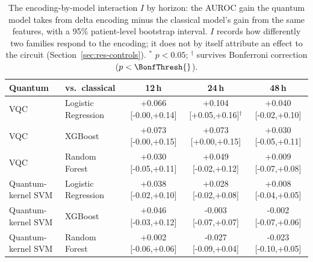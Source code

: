 \begin{table}[!htbp]
\centering
\scriptsize
\renewcommand{\arraystretch}{1.00}
\setlength{\tabcolsep}{3.2pt}
\caption{The encoding-by-model interaction $I$ by horizon: the AUROC gain the quantum model takes from delta encoding minus the classical model's gain from the same features, with a 95\% patient-level bootstrap interval. $I$ records how differently two families respond to the encoding; it does not by itself attribute an effect to the circuit (Section~\ref{sec:res-controls}). $^{*}$ $p<0.05$; $^{\dagger}$ survives Bonferroni correction ($p<\BonfThresh{}$).}
\label{tab:interaction}
\begin{tabular}{llccc}
\hline
Quantum & vs.\ classical & 12\,h & 24\,h & 48\,h \\
\hline
VQC & Logistic Regression & +0.066 [-0.00,+0.14] & +0.104 [+0.05,+0.16]$^{\dagger}$ & +0.040 [-0.02,+0.10] \\
VQC & XGBoost & +0.073 [-0.00,+0.15] & +0.073 [+0.00,+0.15] & +0.030 [-0.05,+0.11] \\
VQC & Random Forest & +0.030 [-0.05,+0.11] & +0.049 [-0.02,+0.12] & +0.009 [-0.07,+0.08] \\
Quantum-kernel SVM & Logistic Regression & +0.038 [-0.02,+0.10] & +0.028 [-0.02,+0.08] & +0.008 [-0.04,+0.05] \\
Quantum-kernel SVM & XGBoost & +0.046 [-0.03,+0.12] & -0.003 [-0.07,+0.07] & -0.002 [-0.07,+0.06] \\
Quantum-kernel SVM & Random Forest & +0.002 [-0.06,+0.06] & -0.027 [-0.09,+0.04] & -0.023 [-0.10,+0.05] \\
\hline
\end{tabular}
\end{table}